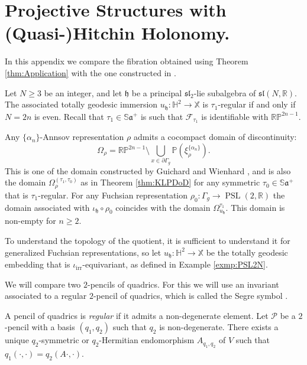 \documentclass[reqno,10pt]{amsart}
\theoremstyle{plain}
\theoremstyle{definition}
\theoremstyle{remark}
\newcommand{\type}{\tau}
\newcommand{\typeS}{{\tau_0}}
\newcommand{\R}{\mathbb{R}}
\newcommand{\Sph}{\mathbb{S}}
\DeclareMathOperator{\PSL}{PSL}
\newcommand{\X}{\mathbb{X}}
\begin{document}
\newpage

\section{Projective Structures with (Quasi-)Hitchin Holonomy.} %
\label{appendix:CompPSL2N}

In this appendix we compare the fibration obtained using Theorem \ref{thm:Application} with the one constructed in \cite{ADL}.

\medskip

Let $N\geq 3$ be an integer, and let $\mathfrak{h}$ be a principal $\mathfrak{sl}_2$-lie subalgebra of $\mathfrak{sl}(N,\R)$. The associated totally geodesic immersion $u_\mathfrak{h}:\mathbb{H}^2\to \X$ is $\type_1$-regular if and only if $N=2n$ is even. Recall that $\type_1\in\Sph\mathfrak{a}^+$ is such that $\mathcal{F}_{\type_1}$ is identifiable with $\mathbb{RP}^{2n-1}$.

\medskip

Any $\lbrace\alpha_n\rbrace$-Annsov representation $\rho$ admits a cocompact domain of discontinuity:
 $$\Omega_\rho=\mathbb{RP}^{2n-1}\setminus \bigcup_{x\in \partial\Gamma_g}\mathbb{P}\left(\xi_\rho^{\lbrace\alpha_n\rbrace}\right).$$
This is one of the domain constructed by Guichard and Wienhard \cite{GWDod}, and is also the domain $\Omega_\rho^{(\type_1,\typeS)}$ as in Theorem \ref{thm:KLPDoD} for any symmetric $\typeS\in \Sph\mathfrak{a}^+$ that is $\type_1$-regular. For any Fuchsian representation $\rho_0:\Gamma_g\to \PSL(2,\R)$ the domain associated with $\iota_\mathfrak{h}\circ \rho_0$ coincides with the domain $\Omega^{\type_1}_{u_\mathfrak{h}}$. This domain is non-empty for $n\geq 2$.

\medskip

To understand the topology of the quotient, it is sufficient to understand it for generalized Fuchsian representations, so let $u_\mathfrak{h}:\mathbb{H}^2\to \X$ be the totally geodesic embedding that is $\iota_\text{irr}$-equivariant, as defined in Example \ref{exmp:PSL2N}.

\medskip

We will compare two $2$-pencils of quadrics. For this we will use an invariant associated to a regular $2$-pencil of quadrics, which is called the Segre symbol \cite{fevola2020pencils}.

\medskip

A pencil of quadrics is \emph{regular} if it admits a non-degenerate element. Let $\mathcal{P}$ be a $2$-pencil with a basis $(q_1,q_2)$ such that $q_2$ is non-degenerate. There exists a unique $q_2$-symmetric or $q_2$-Hermitian endomorphism  $A_{q_1,q_2}$ of $V$ such that $q_1(\cdot,\cdot)=q_2(A\cdot,\cdot)$.
\end{document}
